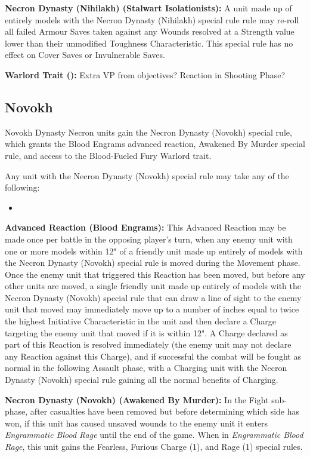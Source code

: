 \begin{multicols}{2}
\textbf{Necron Dynasty (Nihilakh) (Stalwart Isolationists):} A unit made up of entirely models with the Necron Dynasty (Nihilakh) special rule rule may re-roll all failed Armour Saves taken against any Wounds resolved at a Strength value lower than their unmodified Toughness Characteristic. This special rule has no effect on Cover Saves or Invulnerable Saves.

\textbf{Warlord Trait ():} Extra VP from objectives? Reaction in Shooting Phase?


\newpage
\subsection{Novokh}

Novokh Dynasty Necron units gain the Necron Dynasty (Novokh) special rule, which grants the Blood Engrams advanced reaction, Awakened By Murder special rule, and access to the Blood-Fueled Fury Warlord trait.

Any unit with the Necron Dynasty (Novokh) special rule may take any of the following:
\begin{itemize}
	\item %
\end{itemize}

\textbf{Advanced Reaction (Blood Engrams):} This Advanced Reaction may be made once per battle in the opposing player’s turn, when any enemy unit with one or more models within 12" of a friendly unit made up entirely of models with the Necron Dynasty (Novokh) special rule is moved during the Movement phase. Once the enemy unit that triggered this Reaction has been moved, but before any other units are moved, a single friendly unit made up entirely of models with the Necron Dynasty (Novokh) special rule that can draw a line of sight to the enemy unit that moved may immediately move up to a number of inches equal to twice the highest Initiative Characteristic in the unit and then declare a Charge targeting the enemy unit that moved if it is within 12". A Charge declared as part of this Reaction is resolved immediately (the enemy unit may not declare any Reaction against this Charge), and if successful the combat will be fought as normal in the following Assault phase, with a Charging unit with the Necron Dynasty (Novokh) special rule gaining all the normal benefits of Charging.

\textbf{Necron Dynasty (Novokh) (Awakened By Murder):} In the Fight sub-phase, after casualties have been removed but before determining which side has won, if this unit has caused unsaved wounds to the enemy unit it enters \textit{Engrammatic Blood Rage} until the end of the game. When in \textit{Engrammatic Blood Rage}, this unit gains the Fearless, Furious Charge (1), and Rage (1) special rules.


\end{multicols}
